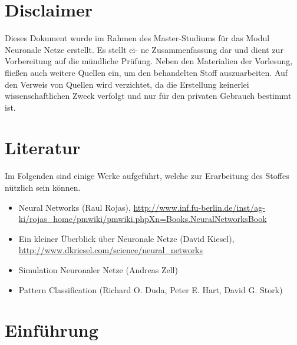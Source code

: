\documentclass[fleqn,10pt]{SelfArx} %
\begin{document}

\section*{Disclaimer}
Dieses Dokument wurde im Rahmen des Master-Studiums
für das Modul Neuronale Netze erstellt. Es stellt ei-
ne Zusammenfassung dar und dient zur Vorbereitung auf die
mündliche Prüfung. Neben den Materialien der Vorlesung,
fließen auch weitere Quellen ein, um den behandelten Stoff
auszuarbeiten. Auf den Verweis von Quellen wird verzichtet,
da die Erstellung keinerlei wissenschaftlichen Zweck verfolgt
und nur für den privaten Gebrauch bestimmt ist.

\section*{Literatur}
Im Folgenden sind einige Werke aufgeführt, welche zur Erarbeitung des Stoffes nützlich sein können.
\begin{itemize}
	\item Neural Networks (Raul Rojas), \url{http://www.inf.fu-berlin.de/inst/ag-ki/rojas_home/pmwiki/pmwiki.phpXn=Books.NeuralNetworksBook}
	\item Ein kleiner Überblick über Neuronale Netze (David Kiesel), \url{http://www.dkriesel.com/science/neural_networks}
	\item Simulation Neuronaler Netze (Andreas Zell)
	\item Pattern Classification (Richard O. Duda, Peter E. Hart, David G. Stork) 
\end{itemize}

\section{Einführung} 


\end{document}
